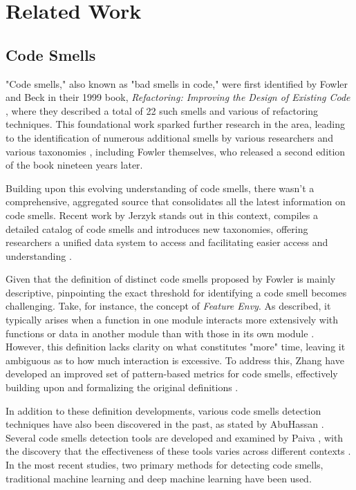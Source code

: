 \section{Related Work}
\label{sec:related}

\subsection{Code Smells}
"Code smells," also known as "bad smells in code," were first identified by Fowler and Beck in their 1999 book, \textit{Refactoring: Improving the Design of Existing Code} \cite{Martin_1999}, where they described a total of 22 such smells and various of refactoring techniques. This foundational work sparked further research in the area, leading to the identification of numerous additional smells by various researchers \cite{Menshawy_Yousef_2021} and various taxonomies \cite{Mäntylä_Lassenius_2006}\cite{Sabir_Palma_Rasool_Guéhéneuc_Moha_2018}\cite{Martin_2008}, including Fowler \etal themselves, who released a second edition of the book \cite{Martin_2018} nineteen years later.

Building upon this evolving understanding of code smells, there wasn't a comprehensive, aggregated source that consolidates all the latest information on code smells. Recent work by Jerzyk \etal stands out in this context, compiles a detailed catalog of code smells and introduces new taxonomies, offering researchers a unified data system to access and facilitating easier access and understanding \cite{Jerzyk_2023}. 

Given that the definition of distinct code smells proposed by Fowler \etal is mainly descriptive, pinpointing the exact threshold for identifying a code smell becomes challenging. Take, for instance, the concept of \textit{Feature Envy}. As described, it typically arises when a function in one module interacts more extensively with functions or data in another module than with those in its own module \cite{Martin_2018}. However, this definition lacks clarity on what constitutes "more" time, leaving it ambiguous as to how much interaction is excessive. To address this, Zhang \etal have developed an improved set of pattern-based metrics for code smells, effectively building upon and formalizing the original definitions \cite{Zhang_2008}.

In addition to these definition developments, various code smells detection techniques have also been discovered in the past, as stated by AbuHassan \etal\cite{AbuHassan_Alshayeb_Mohammad_Ghouti_2020}. Several code smells detection tools are developed and examined by Paiva \etal, with the discovery that the effectiveness of these tools varies across different contexts \cite{Paiva_2017}. In the most recent studies, two primary methods for detecting code smells, traditional machine learning and deep machine learning have been used.

